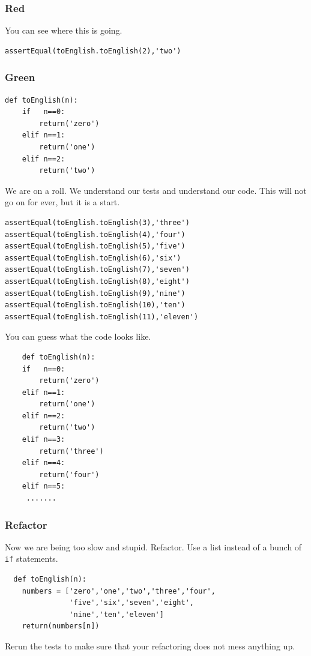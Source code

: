 \documentclass{beamer}
\begin{document}
\begin{frame}[fragile]
\frametitle{Red}
You can see where this is going.
\color{red}
  \begin{lstlisting}
assertEqual(toEnglish.toEnglish(2),'two')
\end{lstlisting}
\color{black}
\end{frame}

\begin{frame}[fragile]
\frametitle{Green}
\begin{lstlisting}
def toEnglish(n):
    if   n==0:
        return('zero')
    elif n==1:
        return('one')
    elif n==2:
        return('two')
\end{lstlisting}
\end{frame}
\begin{frame}[fragile]
 We are on a  roll. We understand our tests and understand our
 code. This will not go on for ever, but it is a start.
  \begin{lstlisting}
assertEqual(toEnglish.toEnglish(3),'three')
assertEqual(toEnglish.toEnglish(4),'four')
assertEqual(toEnglish.toEnglish(5),'five')
assertEqual(toEnglish.toEnglish(6),'six')
assertEqual(toEnglish.toEnglish(7),'seven')
assertEqual(toEnglish.toEnglish(8),'eight')
assertEqual(toEnglish.toEnglish(9),'nine')
assertEqual(toEnglish.toEnglish(10),'ten')
assertEqual(toEnglish.toEnglish(11),'eleven')
\end{lstlisting}
\end{frame}
\begin{frame}[fragile]
You can guess what the code looks like.
\begin{lstlisting}
    def toEnglish(n):
    if   n==0:
        return('zero')
    elif n==1:
        return('one')
    elif n==2:
        return('two')
    elif n==3:
        return('three')
    elif n==4:
        return('four')
    elif n==5:
     ....... 
\end{lstlisting}
\end{frame}
\begin{frame}[fragile]
\frametitle{Refactor}
Now we are being too slow and stupid. Refactor. Use a list instead of
a bunch of {\tt if} statements.
\begin{lstlisting}
  def toEnglish(n):
    numbers = ['zero','one','two','three','four',
               'five','six','seven','eight',
               'nine','ten','eleven']
    return(numbers[n])
\end{lstlisting}
Rerun the tests to make sure that your refactoring does not mess
anything up.
\end{frame}
\end{document}
